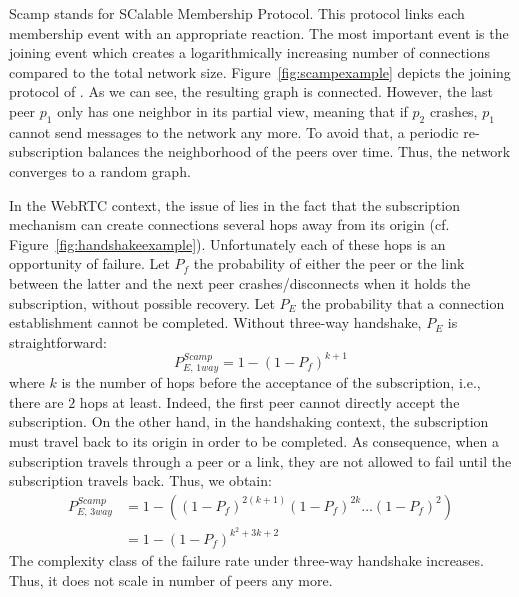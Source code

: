 \begin{asparadesc}
\item [Scamp]\cite{ganesh2001scamp,ganesh2003peer} stands for SCalable
  Membership Protocol. This protocol links each membership event with an
  appropriate reaction.  The most important event is the joining event which
  creates a logarithmically increasing number of connections compared to the
  total network size.  Figure~\ref{fig:scampexample} depicts the joining
  protocol of \SCAMP{}. As we can see, the resulting graph is
  connected. However, the last peer $p_1$ only has one neighbor in its partial
  view, meaning that if $p_2$ crashes, $p_1$ cannot send messages to the
  network any more. To avoid that, a periodic re-subscription balances the
  neighborhood of the peers over time. Thus, the network converges to a random
  graph.

  In the WebRTC context, the issue of \SCAMP{} lies in the fact that the
  subscription mechanism can create connections several hops away from its
  origin (cf. Figure~\ref{fig:handshakeexample}). Unfortunately each of these
  hops is an opportunity of failure. Let $P_f$ the probability of either the
  peer or the link between the latter and the next peer crashes/disconnects
  when it holds the subscription, without possible recovery. Let $P_E$ the
  probability that a connection establishment cannot be completed. Without
  three-way handshake, $P_E$ is straightforward:
  \begin{equation} P_{E,\,1way}^{Scamp}=1-(1- P_f)^{k+1} \end{equation} where
  $k$ is the number of hops before the acceptance of the subscription, i.e.,
  there are $2$ hops at least. Indeed, the first peer cannot directly accept
  the subscription. On the other hand, in the handshaking context, the
  subscription must travel back to its origin in order to be completed. As
  consequence, when a subscription travels through a peer or a link, they are
  not allowed to fail until the subscription travels back. Thus, we obtain:
  \begin{align} P_{E,\,3way}^{Scamp} &=1 - ((1-P_f)^{2(k+1)} (1-P_f)^{2k}
                                       \ldots (1-P_f)^2) \nonumber \\
                                     &=1-(1-P_f)^{k^2+3k+2}
  \end{align}
  The complexity class of the \SCAMP{} failure rate under three-way handshake
  increases. Thus, it does not scale in number of peers any more.
\end{asparadesc}

